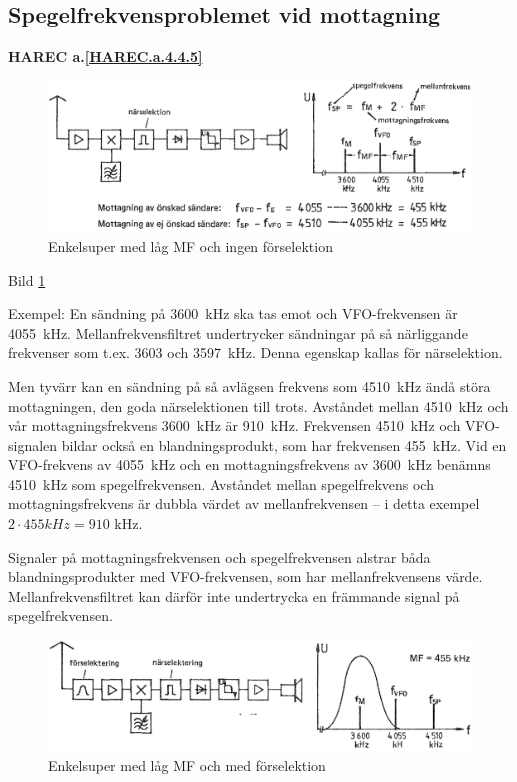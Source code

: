 \subsection{Spegelfrekvensproblemet vid mottagning}
\textbf{HAREC a.\ref{HAREC.a.4.4.5}\label{myHAREC.a.4.4.5}}

\begin{figure}
  \includegraphics[width=\textwidth]{images/cropped_pdfs/bild_2_4-22.pdf}
  \caption{Enkelsuper med låg MF och ingen förselektion}
  \label{fig:bildII4-22}
\end{figure}

Bild \ref{fig:bildII4-22}

Exempel: En sändning på 3600~kHz ska tas emot och VFO-frekvensen är
4055~kHz. Mellanfrekvensfiltret undertrycker sändningar på så
närliggande frekvenser som t.ex. 3603 och 3597~kHz. Denna egenskap
kallas för närselektion.

Men tyvärr kan en sändning på så avlägsen frekvens som 4510~kHz ändå
störa mottagningen, den goda närselektionen till trots. Avståndet
mellan 4510~kHz och vår mottagningsfrekvens 3600~kHz är 910~kHz.
Frekvensen 4510~kHz och VFO-signalen bildar också en
blandningsprodukt, som har frekvensen 455~kHz. Vid en VFO-frekvens av
4055~kHz och en mottagningsfrekvens av 3600~kHz benämns 4510~kHz som
spegelfrekvensen. Avståndet mellan spegelfrekvens och
mottagningsfrekvens är dubbla värdet av mellanfrekvensen -- i detta
exempel \(2 \cdot 455kHz = 910\) kHz.

Signaler på mottagningsfrekvensen och spegelfrekvensen alstrar båda
blandningsprodukter med VFO-frekvensen, som har mellanfrekvensens
värde. Mellanfrekvensfiltret kan därför inte undertrycka en främmande
signal på spegelfrekvensen.

\begin{figure}
  \includegraphics[width=\textwidth]{images/cropped_pdfs/bild_2_4-23.pdf}
  \caption{Enkelsuper med låg MF och med förselektion}
  \label{fig:bildII4-23}
\end{figure}

